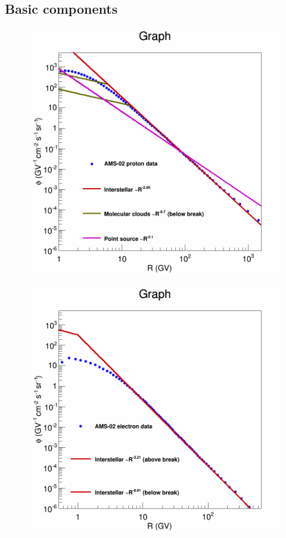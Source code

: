 \subsection{Basic components}

\begin{figure}[h]
  \centering
  \begin{minipage}[h]{0.45\textwidth}
  	\centering
	\includegraphics[width=1.\linewidth]{pic/method/./CR_protons_spectra.png}
  	\subcaption{}
 	\label{fig:proton_spec}
  \end{minipage}
  \hfill
  \begin{minipage}[h]{0.45\textwidth}
	  \centering
	  \includegraphics[width=1.\linewidth]{pic/method/./CR_electrons_spectra.png}

\end{minipage}
\end{figure}
